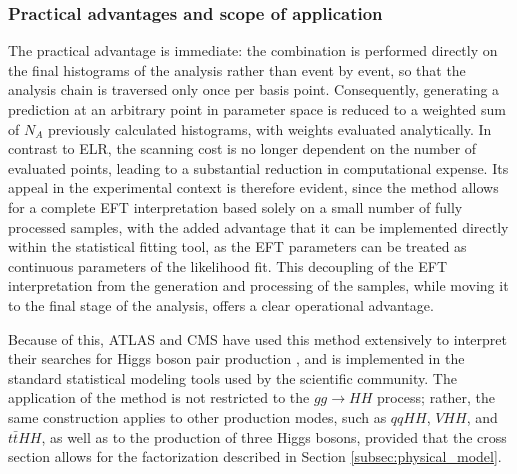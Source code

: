 
\subsubsection{Practical advantages and scope of application}
The practical advantage is immediate: the combination is performed directly on the final histograms of the analysis rather than event by event, so that the analysis chain is traversed only once per basis point. Consequently, generating a prediction at an arbitrary point in parameter space is reduced to a weighted sum of $N_A$ previously calculated histograms, with weights evaluated analytically. In contrast to ELR, the scanning cost is no longer dependent on the number of evaluated points, leading to a substantial reduction in computational expense. Its appeal in the experimental context is therefore evident, since the method allows for a complete EFT interpretation based solely on a small number of fully processed samples, with the added advantage that it can be implemented directly within the statistical fitting tool, as the EFT parameters can be treated as continuous parameters of the likelihood fit. This decoupling of the EFT interpretation from the generation and processing of the samples, while moving it to the final stage of the analysis, offers a clear operational advantage.

Because of this, ATLAS and CMS have used this method extensively to interpret their searches for Higgs boson pair production \cite{CMS_combination, ATLAS-HH-bbtautau-Run2, ATLAS:2025tkn}, and is implemented in the standard statistical modeling tools used by the scientific community. The application of the method is not restricted to the $gg\to HH$ process; rather, the same construction applies to other production modes, such as $qqHH$, $VHH$, and $t\bar{t}HH$, as well as to the production of three Higgs bosons, provided that the cross section allows for the factorization described in Section \ref{subsec:physical_model}.

